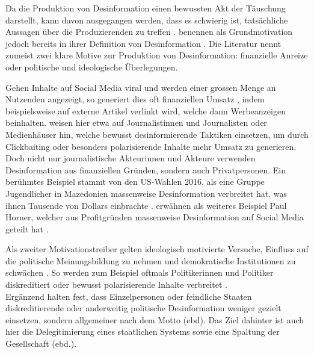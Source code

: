 \documentclass[12pt,a4paper]{article}        %
\begin{document}
Da die Produktion von Desinformation einen bewussten Akt der Täuschung darstellt, kann davon ausgegangen werden, dass es schwierig ist, tatsächliche Aussagen über die Produzierenden zu treffen \parencite[73]{lecheler_disinformation_2022}. \textcite{pennycook_lazy_2019} benennen als Grundmotivation jedoch bereits in ihrer Definition von Desinformation  \parencite[39]{pennycook_lazy_2019}. Die Literatur nennt zumeist zwei klare Motive zur Produktion von Desinformation: finanzielle Anreize oder politische und ideologische Überlegungen.

Gehen Inhalte auf Social Media viral und werden einer grossen Menge an Nutzenden angezeigt, so generiert dies oft finanziellen Umsatz \parencites[217]{allcott_social_2017}[3]{tandoc_jr_facts_2019}[157]{marx_fake_2020}, indem beispielsweise auf externe Artikel verlinkt wird, welche dann Werbeanzeigen beinhalten. \textcite[76]{lecheler_disinformation_2022} weisen hier etwa auf Journalistinnen und Journalisten oder Medienhäuser hin, welche bewusst desinformierende Taktiken einsetzen, um durch Clickbaiting oder besonders polarisierende Inhalte mehr Umsatz zu generieren. \\
Doch nicht nur journalistische Akteurinnen und Akteure verwenden Desinformation aus finanziellen Gründen, sondern auch Privatpersonen. Ein berühmtes Beispiel stammt von den US-Wahlen 2016, als eine Gruppe Jugendlicher in Mazedonien massenweise Desinformation verbreitet hat, was ihnen Tausende von Dollars einbrachte \parencites[217]{allcott_social_2017}[vgl.\ auch][]{subramanian_meet_2017}[3]{tandoc_jr_facts_2019}. \textcite[217]{allcott_social_2017} erwähnen als weiteres Beispiel Paul Horner, welcher aus Profitgründen massenweise Desinformation auf Social Media geteilt hat \parencite[vgl.\ auch][]{dewey_facebook_2016}.

Als zweiter Motivationstreiber gelten ideologisch motivierte Versuche, Einfluss auf die politische Meinungsbildung zu nehmen und demokratische Institutionen zu schwächen \parencites[225]{schmidt_meinungsbildung_2022}[75]{lecheler_disinformation_2022}[157]{marx_fake_2020}. So werden zum Beispiel oftmals Politikerinnen und Politiker diskreditiert \parencites[3]{tandoc_jr_facts_2019}[217]{allcott_social_2017} oder bewusst polarisierende Inhalte verbreitet \parencites[8]{european_parliament_directorate-general_for_external_policies_of_the_union_impact_2021}[3]{tandoc_jr_facts_2019}.\\
Ergänzend halten \textcite[182]{weidner_fake_2019} fest, dass Einzelpersonen oder feindliche Staaten diskreditierende oder anderweitig politische Desinformation weniger gezielt einsetzen, sondern allgemeiner nach dem Motto  (ebd). Das Ziel dahinter ist auch hier die Delegitimierung eines staatlichen Systems sowie eine Spaltung der Gesellschaft (ebd.).
\end{document}
